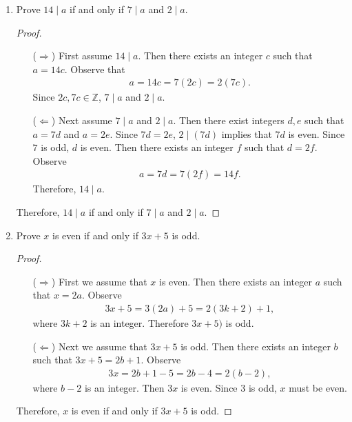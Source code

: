 \documentclass{article}
\theoremstyle{definition}
\begin{document}
    \begin{enumerate}
	\item Prove $14 \mid a$ if and only if $7 \mid a$ and $2\mid a$.
        \begin{proof}
            \begin{enumerate}
                \item[($\Rightarrow$)] First assume $14 \mid a$. Then there exists an integer $c$ such that $a=14c$. Observe that 
                \begin{align*}
                    a = 14c = 7(2c) = 2(7c).
                \end{align*}
                Since $2c, 7c \in \mathbb{Z}$, $7\mid a$ and $2\mid a$.
                \item[($\Leftarrow$)] Next assume $7\mid a$ and $2\mid a$. Then there exist integers $d,e$ such that $a=7d$ and $a=2e$. Since $7d=2e$, $2\mid (7d)$ implies that $7d$ is even. Since $7$ is odd, $d$ is even. Then there exists an integer $f$ such that $d=2f$. Observe 
                \begin{align*}
                    a = 7d = 7(2f) = 14f.
                \end{align*}
                Therefore, $14\mid a$.
            \end{enumerate}
            Therefore, $14 \mid a$ if and only if $7 \mid a$ and $2\mid a$.
        \end{proof}
	\item Prove $x$ is even if and only if $3x+5$ is odd.
        \begin{proof}
            \begin{enumerate}
                \item[($\Rightarrow$)] First we assume that $x$ is even. Then there exists an integer $a$ such that $x=2a$. Observe
                \begin{align*}
                    3x+5 = 3(2a)+5 = 2(3k+2)+1, 
                \end{align*}
                where $3k+2$ is an integer. Therefore $3x+5)$ is odd.
                \item[($\Leftarrow$)] Next we assume that $3x+5$ is odd. Then there exists an integer $b$ such that $3x+5 = 2b+1$. Observe 
                \begin{align*}
                    3x = 2b+1 - 5 = 2b-4 = 2(b-2), 
                \end{align*}
                where $b-2$ is an integer. Then $3x$ is even. Since $3$ is odd, $x$ must be even.
            \end{enumerate}
            Therefore, $x$ is even if and only if $3x+5$ is odd.
        \end{proof}
    \end{enumerate}
\end{document}
